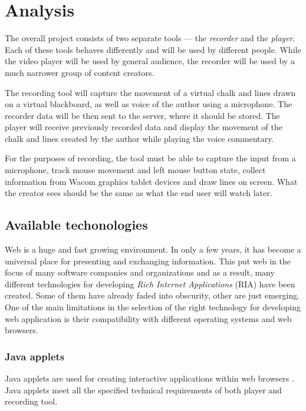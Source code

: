 \chapter{Analysis}

The overall project consists of two separate tools --- the \textit{recorder} and the \textit{player}. Each of these tools behaves differently and will be used by different people. While the video player will be used by general audience, the recorder will be used by a much narrower group of content creators.

The recording tool will capture the movement of a virtual chalk and lines drawn on a virtual blackboard, as well as voice of the author using a microphone. The recorder data will be then sent to the server, where it should be stored. The player will receive previously recorded data and display the movement of the chalk and lines created by the author while playing the voice commentary.

For the purposes of recording, the tool must be able to capture the input from a microphone, track mouse movement and left mouse button state, collect information from Wacom graphics tablet devices and draw lines on screen. What the creator sees should be the same as what the end user will watch later.












\section{Available techonologies}
Web is a huge and fast growing environment. In only a few years, it has become a universal place for presenting and exchanging information. This put web in the focus of many software companies and organizations and as a result, many different technologies for developing \textit{Rich Internet Applications} (RIA) have been created. Some of them have already faded into obscurity, other are just emerging. One of the main limitations in the selection of the right technology for developing web application is their compatibility with different operating systems and web browsers.

\subsection{Java applets}
Java applets are used for creating interactive applications within web browsers \cite{java}. Java applets meet all the specified technical requirements of both player and recording tool.

